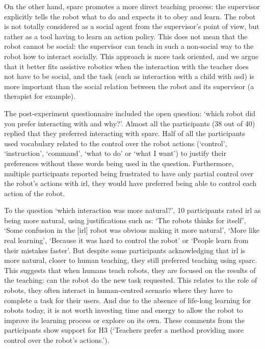 On the other hand, \gls{sparc} promotes a more direct teaching process: the supervisor explicitly tells the robot what to do and expects it to obey and learn. The robot is not totally considered as a social agent from the supervisor's point of view, but rather as a tool having to learn an action policy. This does not mean that the robot cannot be social: the supervisor can teach in such a non-social way to the robot how to interact socially. This approach is more task oriented, and we argue that it better fits assistive robotics when the interaction with the teacher does not have to be social, and the task (such as interaction with a child with \gls{asd}) is more important than the social relation between the robot and its supervisor (a therapist for example).

The post-experiment questionnaire included the open question: `which robot did you prefer interacting with and why?'. Almost all the participants (38 out of 40) replied that they preferred interacting with \gls{sparc}. Half of all the participants used vocabulary related to the control over the robot actions (`control', `instruction', `command', `what to do' or `what I want') to justify their preferences without these words being used in the question. Furthermore, multiple participants reported being frustrated to have only partial control over the robot's actions with \gls{irl}, they would have preferred being able to control each action of the robot. 

To the question `which interaction was more natural?', 10 participants rated \gls{irl} as being more natural, using justifications such as: `The robots thinks for itself', `Some confusion in the [\gls{irl}] robot was obvious making it more natural', `More like real learning', `Because it was hard to control the robot' or `People learn from their mistakes faster'. But despite some participants acknowledging that \gls{irl} is more natural, closer to human teaching, they still preferred teaching using \gls{sparc}. This suggests that when humans teach robots, they are focused on the results of the teaching: can the robot do the new task requested. This relates to the role of robots, they often interact in human-centred scenario where they have to complete a task for their users. And due to the absence of life-long learning for robots today, it is not worth investing time and energy to allow the robot to improve its learning process or explore on its own. These comments from the participants show support for H3 (`Teachers prefer a method providing more control over the robot's actions.').

